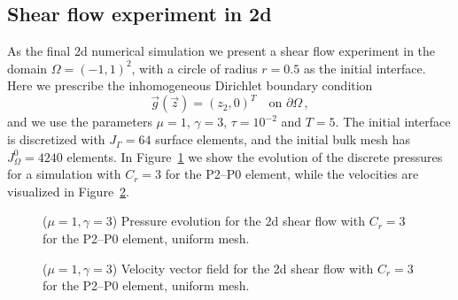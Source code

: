 \documentclass[a4paper,12pt,onecolumn]{article}
\begin{document}
\subsection{Shear flow experiment in 2d}
As the final 2d numerical simulation we present a shear flow experiment
in the domain $\Omega=(-1,1)^2$, with a circle of radius $r=0.5$ as the
initial interface. Here we prescribe the inhomogeneous Dirichlet boundary
condition
\begin{equation*}
\vec g(\vec z)=(z_2,0)^T\quad \mbox{on }\partial\Omega\,,
\end{equation*}
and we use the parameters $\mu=1$, $\gamma=3$, $\tau=10^{-2}$ and $T=5$.
The initial interface is discretized with $J_\Gamma = 64$ surface elements,
and the initial bulk mesh has $J_\Omega^0 = 4240$ elements. In
Figure~\ref{fig:shear_2d} we show the evolution of the discrete pressures
for a simulation with $C_r=3$ for the P2--P0 element, while the velocities
are visualized in Figure~\ref{fig:shear_2d_velocity}.
\begin{figure}[htbp]
\centering
{}
\caption{($\mu=1,\gamma=3$) Pressure evolution for the 2d shear flow with
$C_r=3$ for the P2--P0 element, uniform mesh.}
\label{fig:shear_2d}
\end{figure}

\begin{figure}[htbp]
\centering
{}
\caption{($\mu=1,\gamma=3$) Velocity vector field for the 2d shear flow with
$C_r=3$ for the P2--P0 element, uniform mesh.}
\label{fig:shear_2d_velocity}
\end{figure}
\end{document}
